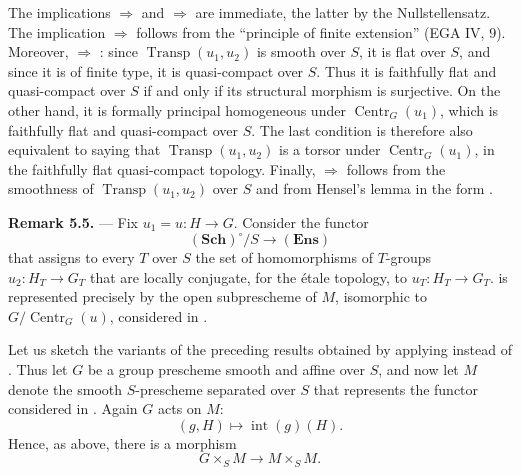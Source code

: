 The implications  \(\Rightarrow\)  and
 \(\Rightarrow\)  are immediate, the latter by the
Nullstellensatz.  The implication  \(\Rightarrow\) 
follows from the ``principle of finite extension'' (EGA IV, 9).
Moreover,  \(\Rightarrow\) : since
\(\operatorname{Transp}(u_1,u_2)\) is smooth over \(S\), it is flat
over \(S\), and since it is of finite type, it is quasi-compact over
\(S\).  Thus it is faithfully flat and quasi-compact over \(S\) if
and only if its structural morphism is surjective.  On the other
hand, it is formally principal homogeneous under
\(\operatorname{Centr}_G(u_1)\), which is faithfully flat and
quasi-compact over \(S\).  The last condition is therefore also
equivalent to saying that \(\operatorname{Transp}(u_1,u_2)\) is a
torsor under \(\operatorname{Centr}_G(u_1)\), in the faithfully flat
quasi-compact topology.  Finally,  \(\Rightarrow\)  follows
from the smoothness of \(\operatorname{Transp}(u_1,u_2)\) over \(S\)
and from Hensel's lemma in the form .

\medskip
\noindent{}\textbf{Remark 5.5.} ---
Fix \(u_1=u:H\to G\).  Consider the functor
\[
  (\mathbf{Sch})^\circ/S\longrightarrow(\mathbf{Ens})
\]
that assigns to every \(T\) over \(S\) the set of homomorphisms of
\(T\)-groups \(u_2:H_T\to G_T\) that are locally conjugate, for the
étale topology, to \(u_T:H_T\to G_T\).   is represented
precisely by the open subprescheme of \(M\), isomorphic to
\(G/\operatorname{Centr}_G(u)\), considered in .

Let us sketch the variants of the preceding results obtained by
applying  instead of .  Thus let \(G\) be a group prescheme
smooth and affine over \(S\), and now let \(M\) denote the smooth
\(S\)-prescheme separated over \(S\) that represents the functor
considered in .  Again \(G\) acts on \(M\):
\[
  (g,H)\longmapsto\operatorname{int}(g)(H).
\]
Hence, as above, there is a morphism
\[
  \tag{x bis}
  G\times_S M\longrightarrow M\times_S M.
\]

